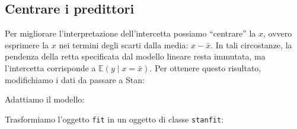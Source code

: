 \documentclass[
  11pt,
]{krantz}
\makeatletter
\newenvironment{Shaded}{\begin{snugshade}}{\end{snugshade}}
\newcommand{\AttributeTok}[1]{\textcolor[rgb]{0.61,0.61,0.61}{#1}}
\newcommand{\DecValTok}[1]{\textcolor[rgb]{0.06,0.06,0.06}{#1}}
\newcommand{\FunctionTok}[1]{\textcolor[rgb]{0,0,0}{#1}}
\newcommand{\NormalTok}[1]{#1}
\newcommand{\OtherTok}[1]{\textcolor[rgb]{0.37,0.37,0.37}{#1}}
\newcommand{\SpecialCharTok}[1]{\textcolor[rgb]{0,0,0}{#1}}
\newenvironment{kframe}{%
\medskip{}
\setlength{\fboxsep}{.8em}
 \def\at@end@of@kframe{}%
 \ifinner\ifhmode%
  \def\at@end@of@kframe{\end{minipage}}%
  \begin{minipage}{\columnwidth}%
 \fi\fi%
 \def\FrameCommand##1{\hskip\@totalleftmargin \hskip-\fboxsep
 \colorbox{shadecolor}{##1}\hskip-\fboxsep
     \hskip-\linewidth \hskip-\@totalleftmargin \hskip\columnwidth}%
 \MakeFramed {\advance\hsize-\width
   \@totalleftmargin\z@ \linewidth\hsize
   \@setminipage}}%
 {\par\unskip\endMakeFramed%
 \at@end@of@kframe}
\renewenvironment{Shaded}{\begin{kframe}}{\end{kframe}}
\newcommand{\E}{\mathbb{E}} %
\theoremstyle{definition}
\theoremstyle{definition}
\theoremstyle{definition}
\theoremstyle{definition}
\theoremstyle{remark}
\makeatother
\begin{document}
\hypertarget{centrare-i-predittori}{%
\subsection{Centrare i predittori}\label{centrare-i-predittori}}

Per migliorare l'interpretazione dell'intercetta possiamo ``centrare'' la \(x\), ovvero esprimere la \(x\) nei termini degli scarti dalla media: \(x - \bar{x}\). In tali circostanze, la pendenza della retta specificata dal modello lineare resta immutata, ma l'intercetta corrisponde a \(\E(y \mid x = \bar{x})\). Per ottenere questo risultato, modifichiamo i dati da passare a Stan:

\begin{Shaded}
\end{Shaded}

Adattiamo il modello:

\begin{Shaded}
\end{Shaded}

Trasformiamo l'oggetto \texttt{fit} in un oggetto di classe \texttt{stanfit}:

\begin{Shaded}
\end{Shaded}
\end{document}

